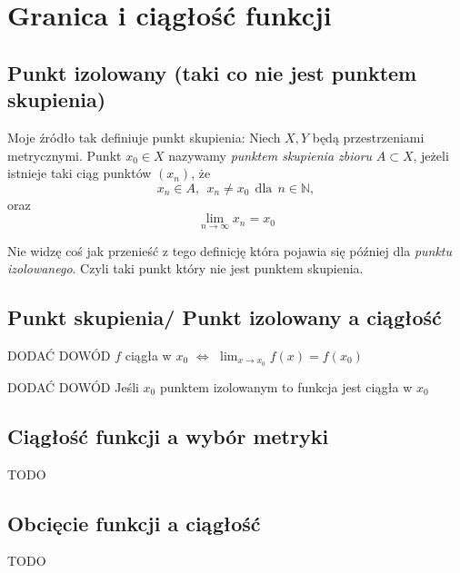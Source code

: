 \documentclass{article}
\begin{document}
\section{Granica i ciągłość funkcji}

\subsection{Punkt izolowany (taki co nie jest punktem skupienia)}

Moje źródło tak definiuje punkt skupienia: Niech \(X, Y\) będą przestrzeniami metrycznymi. Punkt \(x_0 \in X\) nazywamy
\emph{punktem skupienia zbioru} \(A \subset X\), jeżeli istnieje taki ciąg punktów \((x_n)\), że
\begin{equation*}
    x_n \in A, \ \ x_n \neq x_0 \ \ \mbox{dla} \ \ n \in \mathbb{N},
\end{equation*}
oraz
\begin{equation*}
    \lim_{n \to \infty} x_n = x_0
\end{equation*}

Nie widzę coś jak przenieść z tego definicję która pojawia się później dla \emph{punktu izolowanego}. Czyli taki punkt
który nie jest punktem skupienia.

\subsection{Punkt skupienia/ Punkt izolowany a ciągłość}
\begin{center}
    DODAĆ DOWÓD \(f\) ciągła w \(x_0\) \(\iff\) \(\lim_{x \to x_0} f(x) = f(x_0)\)
\end{center}
\begin{center}
    DODAĆ DOWÓD Jeśli \(x_0\) punktem izolowanym to funkcja jest ciągła w \(x_0\)
\end{center}

\subsection{Ciągłość funkcji a wybór metryki}

\begin{center}
    TODO
\end{center}

\subsection{Obcięcie funkcji a ciągłość}

\begin{center}
    TODO
\end{center}
\end{document}
